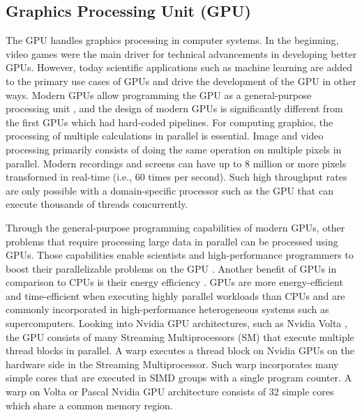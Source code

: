 \subsection{Graphics Processing Unit (GPU)}
The GPU handles graphics processing in computer systems. In the beginning, video games were the main driver for technical advancements in developing better GPUs. However, today scientific applications such as machine learning are added to the primary use cases of GPUs and drive the development of the GPU in other ways. Modern GPUs allow programming the GPU as a general-purpose processing unit \cite{nickollsGPUComputingEra2010}, and the design of modern GPUs is significantly different from the first GPUs which had hard-coded pipelines. For computing graphics, the processing of multiple calculations in parallel is essential. Image and video processing primarily consists of doing the same operation on multiple pixels in parallel. Modern recordings and screens can have up to 8 million or more pixels transformed in real-time (i.e., 60 times per second). Such high throughput rates are only possible with a domain-specific processor such as the GPU that can execute thousands of threads concurrently.

Through the general-purpose programming capabilities of modern GPUs, other problems that require processing large data in parallel can be processed using GPUs. Those capabilities enable scientists and high-performance programmers to boost their parallelizable problems on the GPU \cite{cohenSolvingComputationalProblems2009,nickollsScalableParallelProgramming2008,stoneAcceleratingMolecularModeling2007}.
Another benefit of GPUs in comparison to CPUs is their energy efficiency \cite{qasaimehComparingEnergyEfficiency2019}. GPUs are more energy-efficient and time-efficient when executing highly parallel workloads than CPUs and are commonly incorporated in high-performance heterogeneous systems such as supercomputers. \cite{dellGPUExpanseHPC2020}
Looking into Nvidia GPU architectures, such as Nvidia Volta \cite{NVIDIATESLAV1002017}, the GPU consists of many Streaming Multiprocessors (SM) that execute multiple thread blocks in parallel. A warp executes a thread block on Nvidia GPUs on the hardware side in the Streaming Multiprocessor. Such warp incorporates many simple cores that are executed in SIMD groups with a single program counter. A warp on Volta or Pascal Nvidia GPU architecture consists of 32 simple cores which share a common memory region.

